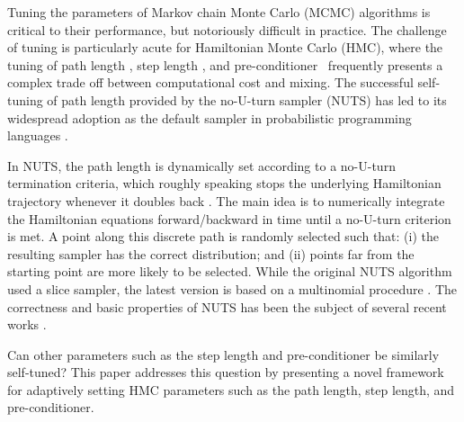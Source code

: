\documentclass[ejs]{imsart}
\theoremstyle{plain}%
\theoremstyle{remark}
\begin{document}
Tuning the parameters of Markov chain Monte Carlo (MCMC) algorithms is critical to their  performance, but notoriously difficult in practice.  The challenge of tuning is particularly acute for Hamiltonian Monte Carlo (HMC), where the tuning of path length \cite{HoGe2014,BoSa2017,betancourt2017conceptual,kleppe2022connecting}, step length \cite{BePiRoSaSt2013,betancourt2014optimizing,biron2023automala}, and pre-conditioner \cite{GiCa2011,kleppe2016adaptive,whalley2024randomized}~frequently presents a complex trade off between computational cost and mixing.   The successful self-tuning of path length provided by the no-U-turn sampler (NUTS) has led to its widespread adoption as the default sampler in probabilistic programming languages \cite{carpenter2016stan,salvatier2016probabilistic,nimble-article:2017,ge2018t,phan2019composable}.

In NUTS, the path length is  dynamically set according to a no-U-turn termination criteria, which roughly speaking stops the underlying Hamiltonian trajectory whenever it doubles back \cite{HoGe2014,betancourt2017conceptual}. The main idea is to numerically integrate the Hamiltonian equations forward/backward in time until a no-U-turn criterion is met. A point along this discrete path is randomly selected such that: (i) the resulting sampler has the correct distribution; and (ii) points far from the starting point are more likely to be selected.  While the original NUTS algorithm used a slice sampler, the latest version is based on a multinomial procedure \cite[Appendix A]{betancourt2017conceptual}.  The correctness and basic properties of NUTS has been the subject of several recent works \cite{andrieu2020general, durmus2023convergence}.   

Can other parameters such as the step length and pre-conditioner be similarly self-tuned?   
This paper addresses this question by presenting a novel framework for adaptively setting HMC parameters such as the path length, step length, and pre-conditioner.  
\end{document}
